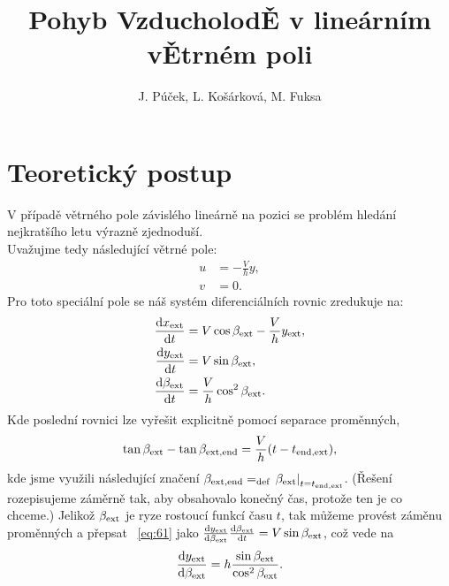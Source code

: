 \documentclass[reqno, a4paper]{amsart}
\author{J. Púček, L. Košárková, M. Fuksa}
\title{Pohyb Vzducholod\v{E} v lineárním v\v{E}trném poli}
\begin{document}
\maketitle
\section{Teoretický postup}
\label{sec:teorie}
V případě větrného pole závislého lineárně na pozici se problém hledání nejkratšího letu výrazně zjednoduší. \\
Uvažujme tedy následující větrné pole:
\begin{subequations}
  \label{eq:56}
  \begin{align}
    \label{eq:57}
    u &= - \frac{V}{h}y, \\
    \label{eq:58}
    v &= 0.
  \end{align}
\end{subequations}
Pro toto speciální pole se náš systém diferenciálních rovnic zredukuje na:
\begin{subequations}
  \label{eq:59}
  \begin{align}
    \label{eq:60}
    \frac{\mathrm{d} {x_{\mathrm{ext}}}}{\mathrm{d} {t}}
    &=
      V \cos \beta_{\mathrm{ext}} - \frac{V}{h}y_{\mathrm{ext}},  \\
    \label{eq:61}
    \frac{\mathrm{d} {y_{\mathrm{ext}}}}{\mathrm{d} {t}}
    &=
      V \sin \beta_{\mathrm{ext}},  \\
    \label{eq:62}
    \frac{\mathrm{d} {\beta_{\mathrm{ext}}}}{\mathrm{d} {t}}
    &=
      \frac{V}{h}
      \cos^2 \beta_{\mathrm{ext}}
      .
  \end{align}
\end{subequations}
Kde poslední rovnici lze vyřešit explicitně pomocí separace proměnných,
\begin{equation}
  \label{eq:63}
  \tan \beta_{\mathrm{ext}} -  \tan \beta_{\mathrm{ext}, \mathrm{end}} = \frac{V}{h} (t - t_{\mathrm{end}, \mathrm{ext}}), 
\end{equation}
kde jsme využili následující značení $\beta_{\mathrm{ext}, \mathrm{end}} = _{\mathrm{def}} \left. \beta_{\mathrm{ext}} \right|_{t = t_{\mathrm{end}, \mathrm{ext}}} $. (Řešení rozepisujeme záměrně tak, aby obsahovalo konečný čas, protože ten je co chceme.) Jelikož $\beta_{\mathrm{ext}}$ je ryze rostoucí funkcí času $t$, tak můžeme provést záměnu proměnných a přepsat ~\eqref{eq:61} jako
$
  \frac{\mathrm{d} {y_{\mathrm{ext}}}}{\mathrm{d} {\beta_{\mathrm{ext}}}} \frac{\mathrm{d} {\beta_{\mathrm{ext}}}}{\mathrm{d} {t}}
  =
  V \sin \beta_{\mathrm{ext}}
$,
což vede na
\begin{equation}
  \label{eq:64}
  \frac{\mathrm{d} {y_{\mathrm{ext}}}}{\mathrm{d} {\beta_{\mathrm{ext}}}} = h \frac{\sin \beta_{\mathrm{ext}}}{\cos^2 \beta_{\mathrm{ext}}}.
\end{equation}
\end{document}

